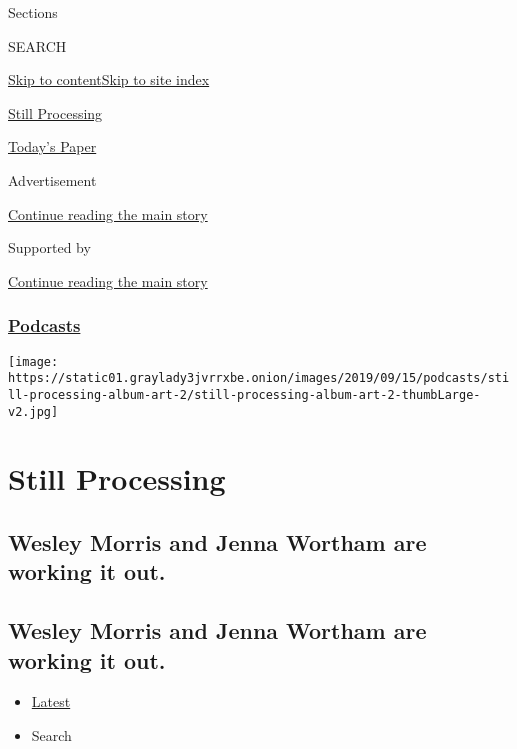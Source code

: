 Sections

SEARCH

\protect\hyperlink{site-content}{Skip to
content}\protect\hyperlink{site-index}{Skip to site index}

\href{https://www.nytimes3xbfgragh.onion/column/still-processing-podcast}{Still
Processing}

\href{https://myaccount.nytimes3xbfgragh.onion/auth/login?response_type=cookie\&client_id=vi}{}

\href{https://www.nytimes3xbfgragh.onion/section/todayspaper}{Today's
Paper}

Advertisement

\protect\hyperlink{after-top}{Continue reading the main story}

Supported by

\protect\hyperlink{after-sponsor}{Continue reading the main story}

\hypertarget{podcasts}{%
\subsubsection{\texorpdfstring{\href{/spotlight/podcasts}{Podcasts}}{Podcasts}}\label{podcasts}}

\texttt{[image: https://static01.graylady3jvrrxbe.onion/images/2019/09/15/podcasts/still-processing-album-art-2/still-processing-album-art-2-thumbLarge-v2.jpg]}

\hypertarget{still-processing}{%
\section{Still Processing}\label{still-processing}}

\hypertarget{wesley-morris-and-jenna-wortham-are-working-it-out}{%
\subsection{Wesley Morris and Jenna Wortham are working it
out.}\label{wesley-morris-and-jenna-wortham-are-working-it-out}}

\hypertarget{wesley-morris-and-jenna-wortham-are-working-it-out-1}{%
\subsection{Wesley Morris and Jenna Wortham are working it
out.}\label{wesley-morris-and-jenna-wortham-are-working-it-out-1}}

\begin{itemize}
\tightlist
\item
  \protect\hyperlink{stream-panel}{Latest}
\item
  Search
\end{itemize}

